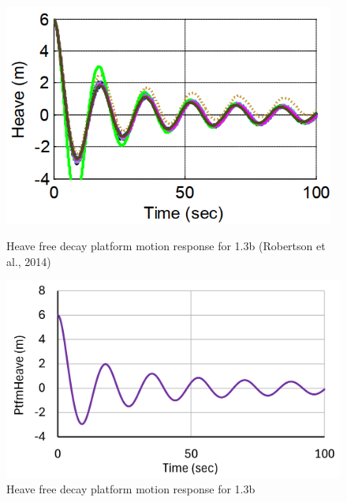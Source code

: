 \documentclass[a4paper]{article}
\begin{document}
\begin{figure}[H]
    \begin{minipage}{0.47\textwidth}
        \centering
        \includegraphics[width=0.97\textwidth]{1.3b_heave.png}
        \caption{\small Heave free decay platform motion response for 1.3b (Robertson et al., 2014)}
        \label{fig:1.3b_heave}
    \end{minipage}
    \hfill
    \begin{minipage}{0.5\textwidth}
        \centering
        \includegraphics[width=1\textwidth]{1.3b_heave_mine.png}
        \caption{\small Heave free decay platform motion response for 1.3b}
        \label{fig:1.3b_heave_mine}
    \end{minipage}
\end{figure}
\end{document}
